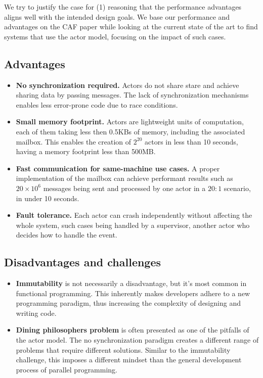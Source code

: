We try to justify the case for (1) reasoning that the performance advantages aligns well with the intended design goals. We base our performance and advantages on the CAF paper while looking at the current state of the art to find systems that use the actor model, focusing on the impact of such cases.

\subsection*{Advantages}
\begin{itemize}
\item \textbf{No synchronization required.} Actors do not share stare and achieve sharing data by passing messages. The lack of synchronization mechanisms enables less error-prone code due to race conditions.
\item \textbf{Small memory footprint.} Actors are lightweight units of computation, each of them taking less then 0.5KBs of memory, including the associated mailbox. This enables the creation of $2^{20}$ actors in less than 10 seconds, having a memory footprint less than 500MB\cite{charousset}.
\item \textbf{Fast communication for same-machine use cases.} A proper implementation of the mailbox can achieve performant results such as $20 \times 10^6$ messages being sent and processed by one actor in a $20:1$ scenario, in under 10 seconds.\cite{charousset}
\item \textbf{Fault tolerance.} Each actor can crash independently without affecting the whole system, such cases being handled by a supervisor, another actor who decides how to handle the event. \cite{hewitt}
\end{itemize}

\subsection*{Disadvantages and challenges}
\begin{itemize}
\item \textbf{Immutability} is not necessarily a disadvantage, but it's most common in functional programming. This inherently makes developers adhere to a new programming paradigm, thus increasing the complexity of designing and writing code.
\item \textbf{Dining philosophers problem} is often presented as one of the pitfalls of the actor model. The no synchronization paradigm creates a different range of problems that require different solutions. Similar to the immutability challenge, this imposes a different mindset than the general development process of parallel programming.
\end{itemize}

